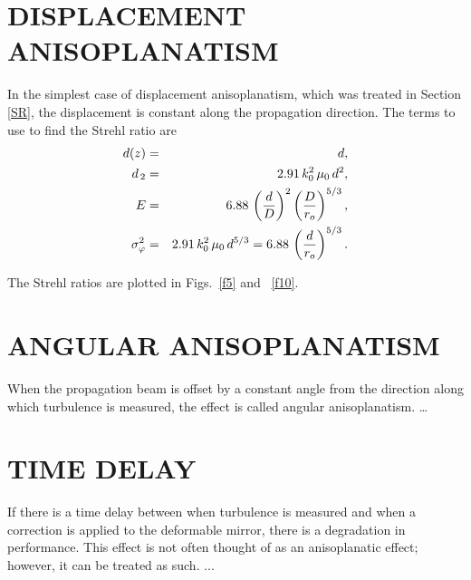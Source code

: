 \section{ DISPLACEMENT ANISOPLANATISM}
\label{da}
In the simplest case of displacement  anisoplanatism, which was
treated in Section \ref{SR}, the displacement is  constant along
the propagation direction.  The terms to use to find the  Strehl
ratio are  \begin{eqnarray}  d(z)&=&d  ,  \\
d_{\,2}&=&2.91\,k_0^2\,\mu _0\,d^2  ,     \\ E&=&6.88\,\left( {{d
\over D}} \right)^2\left(  {{D \over {r_o}}} \right)^{5/3}  ,
 \\ \sigma _\varphi ^2&=&2.91\,k_0^2\,\mu _0\,d^{5/3}=6.88\, \left(
{{d \over {r_o}}} \right)^{5/3}  .  \end{eqnarray}

The Strehl
ratios are plotted in Figs.~\ref{f5}  and ~\ref{f10}.

\section{ ANGULAR ANISOPLANATISM}
\label{aa}
When the propagation beam is offset by a  constant angle from the
direction along which turbulence is measured,  the effect is called
angular anisoplanatism.\cite{4} \ldots

\section{ TIME DELAY}
\label{td}
If there is a time delay  between when turbulence is measured and
when a correction is applied to the deformable mirror, there is  a
degradation in performance.\cite{7}  This effect is not often
thought of  as an anisoplanatic effect; however, it can be treated
as such.  ...

